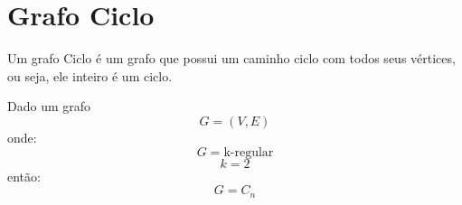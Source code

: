 \documentclass{report}
\begin{document}
\section{Grafo Ciclo}
Um grafo Ciclo é um grafo que possui um caminho ciclo com todos seus vértices, ou seja, ele inteiro é um ciclo.

\begin{center}
\end{center}
{

	Dado um grafo
	\[
		G = (V, E)
	\]
	onde:
	\[
		G = \text{k-regular}
	\]
	\[
		k = 2
	\]
	então:
	\[
		G = C_n
	\]
}
\end{document}
